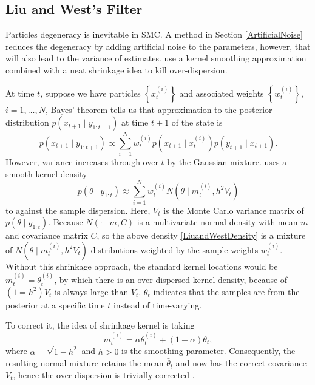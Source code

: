 


\subsection{Liu and West's Filter}

Particles degeneracy is inevitable in SMC. A method in Section \ref{ArtificialNoise} reduces the degeneracy by adding artificial noise to the parameters, however, that will also lead to the variance of estimates. \cite{liu2001combined} use a kernel smoothing approximation combined with a neat shrinkage idea to kill over-dispersion. 

At time $t$, suppose we have particles $\left\lbrace x_t^{(i)}\right\rbrace$ and associated weights $\left\lbrace w_t^{(i)}\right\rbrace$, $i=1,\ldots,N$, Bayes' theorem tells us that approximation to the posterior distribution $p(x_{t+1}\mid y_{1:t+1})$ at time $t+1$ of the state is 
\begin{equation}
p(x_{t+1} \mid y_{1:t+1}) \propto \sum_{i=1}^{N} w_t^{(i)} p\left(x_{t+1} \mid x_t^{(i)}\right)p\left(y_{t+1}\mid x_{t+1}\right).
\end{equation}
However, variance increases through over $t$ by the Gaussian mixture. \cite{west1993mixture} uses a smooth kernel density 
\begin{equation}\label{LiuandWestDensity}
p(\theta\mid y_{1:t})\approx \sum_{i=1}^{N}w_t^{(i)} N\left(\theta\mid m_t^{(i)},h^2V_t\right)
\end{equation}
to against the sample dispersion. Here, $V_t$ is the Monte Carlo variance matrix of $p(\theta\mid y_{1:t})$. Because $N(\cdot\mid m,C)$ is a multivariate normal density with mean $m$ and covariance matrix $C$, so the above density \eqref{LiuandWestDensity} is a mixture of $N\left(\theta\mid m_t^{(i)},h^2V_t\right)$ distributions weighted by the sample weights $w_t^{(i)}$. Without this shrinkage approach, the standard kernel locations would be $m_t^{(i)}=\theta_t^{(i)}$, by which there is an over dispersed kernel density, because of $(1=h^2)V_t$ is always large than $V_t$. $\theta_t$ indicates that the samples are from the posterior at a specific time $t$ instead of time-varying. 

To correct it, the idea of shrinkage kernel is taking 
\begin{equation}
m_t^{(i)}=\alpha \theta_t^{(i)} + (1-\alpha)\bar{\theta}_t,
\end{equation}
where $\alpha=\sqrt{1-h^2}$ and $h>0$ is the smoothing parameter.
Consequently, the resulting normal mixture retains the mean $\bar{\theta}_t$ and now has the correct covariance $V_t$, hence the over dispersion is trivially corrected \citep{liu2001combined}. 

